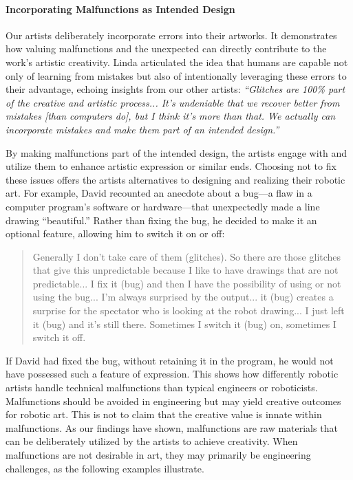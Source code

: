 \paragraph{Incorporating Malfunctions as Intended Design}
Our artists deliberately incorporate errors into their artworks. It demonstrates how valuing malfunctions and the unexpected can directly contribute to the work's artistic creativity. Linda articulated the idea that humans are capable not only of learning from mistakes but also of intentionally leveraging these errors to their advantage, echoing insights from our other artists: \textit{``Glitches are 100\% part of the creative and artistic process... It's undeniable that we recover better from mistakes [than computers do], but I think it's more than that. We actually can incorporate mistakes and make them part of an intended design.''}

By making malfunctions part of the intended design, the artists engage with and utilize them to enhance artistic expression or similar ends. Choosing not to fix these issues offers the artists alternatives to designing and realizing their robotic art. For example, David recounted an anecdote about a bug---a flaw in a computer program's software or hardware---that unexpectedly made a line drawing ``beautiful.'' Rather than fixing the bug, he decided to make it an optional feature, allowing him to switch it on or off:

\begin{quote}
    Generally I don't take care of them (glitches). So there are those glitches that give this unpredictable because I like to have drawings that are not predictable... I fix it (bug) and then I have the possibility of using or not using the bug... I'm always surprised by the output... it (bug) creates a surprise for the spectator who is looking at the robot drawing... I just left it (bug) and it's still there. Sometimes I switch it (bug) on, sometimes I switch it off.
\end{quote}

If David had fixed the bug, without retaining it in the program, he would not have possessed such a feature of expression. This shows how differently robotic artists handle technical malfunctions than typical engineers or roboticists. Malfunctions should be avoided in engineering but may yield creative outcomes for robotic art. This is not to claim that the creative value is innate within malfunctions. As our findings have shown, malfunctions are raw materials that can be deliberately utilized by the artists to achieve creativity. When malfunctions are not desirable in art, they may primarily be engineering challenges, as the following examples illustrate.

